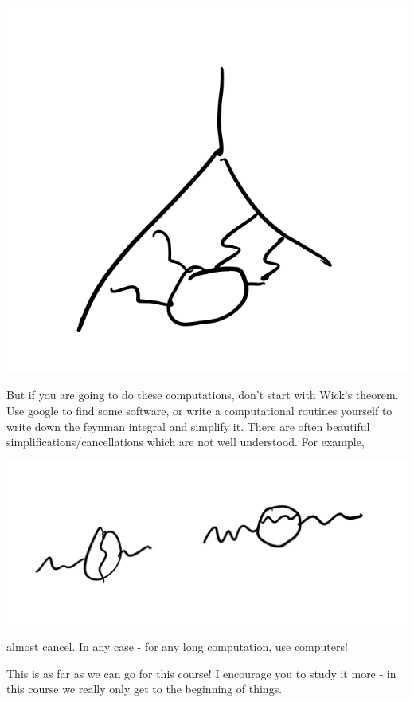 \begin{center}
    \includegraphics[scale=0.5]{Images/lec32p5.png}
\end{center}

But if you are going to do these computations, don't start with Wick's theorem. Use google to find some software, or write a computational routines yourself to write down the feynman integral and simplify it. There are often beautiful simplifications/cancellations which are not well understood. For example, 
\begin{center}
    \includegraphics[scale=0.5]{Images/lec32p6.png}
\end{center}
almost cancel. In any case - for any long computation, use computers!

This is as far as we can go for this course! I encourage you to study it more - in this course we really only get to the beginning of things.